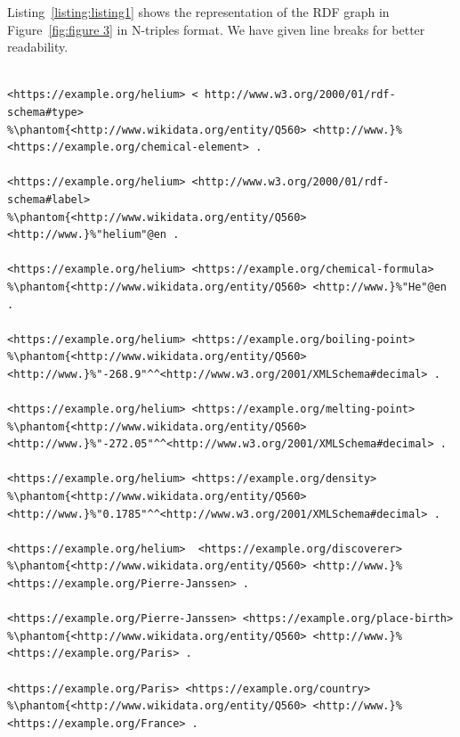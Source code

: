 Listing~\ref{listing:listing1} shows the representation of the RDF graph in Figure~\ref{fig:figure 3} in N-triples format. We have given line breaks for better readability.

\begin{minipage}{\linewidth}
\begin{lstlisting}[columns=fullflexible, label=listing:listing1, caption={RDF graph represented in N-triples syntax}, language=SPARQL]

<https://example.org/helium> < http://www.w3.org/2000/01/rdf-schema#type>
%\phantom{<http://www.wikidata.org/entity/Q560> <http://www.}%<https://example.org/chemical-element> .
		                                                
<https://example.org/helium> <http://www.w3.org/2000/01/rdf-schema#label> 
%\phantom{<http://www.wikidata.org/entity/Q560> <http://www.}%"helium"@en .

<https://example.org/helium> <https://example.org/chemical-formula> 
%\phantom{<http://www.wikidata.org/entity/Q560> <http://www.}%"He"@en .

<https://example.org/helium> <https://example.org/boiling-point> 
%\phantom{<http://www.wikidata.org/entity/Q560> <http://www.}%"-268.9"^^<http://www.w3.org/2001/XMLSchema#decimal> .

<https://example.org/helium> <https://example.org/melting-point> 
%\phantom{<http://www.wikidata.org/entity/Q560> <http://www.}%"-272.05"^^<http://www.w3.org/2001/XMLSchema#decimal> .

<https://example.org/helium> <https://example.org/density> 
%\phantom{<http://www.wikidata.org/entity/Q560> <http://www.}%"0.1785"^^<http://www.w3.org/2001/XMLSchema#decimal> .

<https://example.org/helium>  <https://example.org/discoverer> 
%\phantom{<http://www.wikidata.org/entity/Q560> <http://www.}%<https://example.org/Pierre-Janssen> .

<https://example.org/Pierre-Janssen> <https://example.org/place-birth> 
%\phantom{<http://www.wikidata.org/entity/Q560> <http://www.}%<https://example.org/Paris> .

<https://example.org/Paris> <https://example.org/country>
%\phantom{<http://www.wikidata.org/entity/Q560> <http://www.}%<https://example.org/France> .

\end{lstlisting}
\end{minipage}

